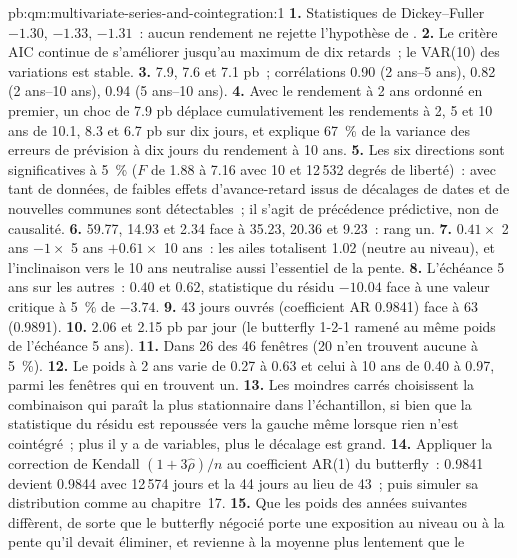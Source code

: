 \begin{solution}{pb:qm:multivariate-series-and-cointegration:1}
\textbf{1.} Statistiques de Dickey--Fuller $-1.30$, $-1.33$, $-1.31$~: aucun rendement ne rejette l'hypothèse de .
\textbf{2.} Le critère AIC continue de s'améliorer jusqu'au maximum de dix retards~; le VAR(10) des variations est stable.
\textbf{3.} 7.9, 7.6 et 7.1 pb~; corrélations 0.90 (2 ans--5 ans), 0.82 (2 ans--10 ans), 0.94 (5 ans--10 ans).
\textbf{4.} Avec le rendement à 2 ans ordonné en premier, un choc de 7.9 pb déplace cumulativement les rendements à 2, 5 et 10 ans de 10.1, 8.3 et 6.7 pb sur dix jours, et explique 67~\% de la
variance des erreurs de prévision à dix jours du rendement à 10 ans.
\textbf{5.} Les six directions sont significatives à 5~\% ($F$ de 1.88 à 7.16 avec 10 et 12\,532 degrés de liberté)~: avec tant de données, de faibles effets d'avance-retard issus de décalages
de dates et de nouvelles communes sont détectables~; il s'agit de précédence prédictive, non de causalité.
\textbf{6.} 59.77, 14.93 et 2.34 face à 35.23, 20.36 et 9.23~: rang un.
\textbf{7.} $0.41 \times$ 2 ans $- 1 \times$ 5 ans $+ 0.61 \times$ 10 ans~: les ailes totalisent 1.02 (neutre au niveau), et l'inclinaison vers le 10 ans neutralise aussi l'essentiel de la
pente.
\textbf{8.} L'échéance 5 ans sur les autres~: $0.40$ et $0.62$, statistique du résidu $-10.04$ face à une valeur critique à 5~\% de $-3.74$.
\textbf{9.} 43 jours ouvrés (coefficient AR 0.9841) face à 63 (0.9891).
\textbf{10.} 2.06 et 2.15 pb par jour (le butterfly 1-2-1 ramené au même poids de l'échéance 5 ans).
\textbf{11.} Dans 26 des 46 fenêtres (20 n'en trouvent aucune à 5~\%).
\textbf{12.} Le poids à 2 ans varie de 0.27 à 0.63 et celui à 10 ans de 0.40 à 0.97, parmi les fenêtres qui en trouvent un.
\textbf{13.} Les moindres carrés choisissent la combinaison qui paraît la plus stationnaire dans l'échantillon, si bien que la statistique du résidu est repoussée vers la gauche même lorsque rien n'est
cointégré~; plus il y a de variables, plus le décalage est grand.
\textbf{14.} Appliquer la correction de Kendall $(1 + 3\hat\rho)/n$ au coefficient AR(1) du butterfly~: 0.9841 devient 0.9844 avec 12\,574 jours et la  44 jours
au lieu de 43~; puis simuler sa distribution comme au chapitre~17.
\textbf{15.} Que les poids des années suivantes diffèrent, de sorte que le butterfly négocié porte une exposition au niveau ou à la pente qu'il devait éliminer, et revienne à la moyenne plus lentement que le

\end{solution}
